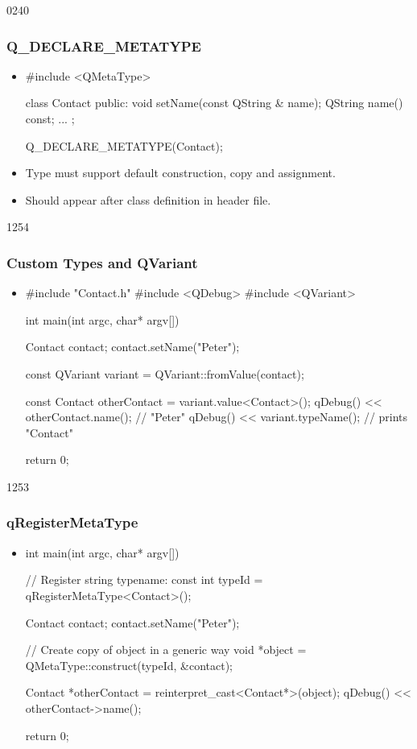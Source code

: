 \begin{slide}[fragile]{0240}
\frametitle{Q\_DECLARE\_METATYPE}
\begin{itemize}
\item[]
\begin{cpp}
#include <QMetaType>

class Contact
{
  public:
    void setName(const QString & name);
    QString name() const;
  ...
};

Q_DECLARE_METATYPE(Contact);
\end{cpp}\vspace*{5mm}
\item Type must support default construction, copy and assignment.
\item Should appear after class definition in header file.
\end{itemize}
\end{slide}

\begin{slide}[fragile]{1254}
\frametitle{Custom Types and QVariant}

\begin{itemize}
\item[]
\begin{cpp}
#include "Contact.h"
#include <QDebug>
#include <QVariant>

int main(int argc, char* argv[])
{
    Contact contact;
    contact.setName("Peter");

    const QVariant variant = QVariant::fromValue(contact);

    const Contact otherContact = variant.value<Contact>();
    qDebug() << otherContact.name(); // "Peter"
    qDebug() << variant.typeName();  // prints "Contact"

    return 0;
}
\end{cpp}
\end{itemize}
\end{slide}

\begin{slide}[fragile]{1253}
\frametitle{qRegisterMetaType}
\begin{itemize}
\item[]
\begin{cpp}
int main(int argc, char* argv[])
{
    // Register string typename:
    const int typeId = qRegisterMetaType<Contact>();

    Contact contact;
    contact.setName("Peter");

    // Create copy of object in a generic way
    void *object = QMetaType::construct(typeId, &contact);

    Contact *otherContact = reinterpret_cast<Contact*>(object);
    qDebug() << otherContact->name();

    return 0;
}
\end{cpp}
\end{itemize}
\end{slide}

